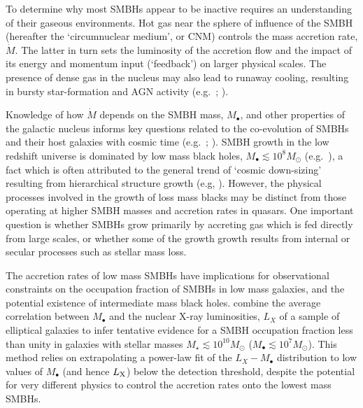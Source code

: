\documentclass[usenatbib,fleqn]{mn2e}
\newcommand{\Mbh}[1][]{M_{\bullet#1}}
\begin{document}
To determine why most SMBHs appear to be inactive requires an understanding of their gaseous environments.  Hot gas near the sphere of influence of the SMBH (hereafter the `circumnuclear medium', or CNM) controls the mass accretion rate, $\dot{M}$.  The latter in turn sets the luminosity of the accretion flow and the impact of its energy and momentum input (`feedback') on larger physical scales.  The presence of dense gas in the nucleus may also lead to runaway cooling, resulting in bursty star-formation and AGN activity (e.g.~\citealt{Ciotti&Ostriker07}; \citealt{Ciotti+10}).

Knowledge of how $\dot{M}$ depends on the SMBH mass, $\Mbh$, and other properties of the
galactic nucleus informs key questions related to the co-evolution of SMBHs and their host galaxies with cosmic time (e.g.~\citealt{Kormendy&Ho13}; \citealt{Heckman&Best14}).  SMBH growth in the low redshift universe is dominated by low mass black holes, $M_{\bullet} \lesssim 10^{8}M_{\odot}$ (e.g.~\citealt{Heckman+04}), a fact which is often attributed to the general trend of `cosmic down-sizing' resulting from hierarchical structure growth (e.g, \citealt{Gallo+08}).  However, the physical processes involved in the growth of loss mass blacks may be distinct from those operating at higher SMBH masses and accretion rates in quasars.  One important question is whether SMBHs grow primarily by accreting gas which is fed directly from large scales, or whether some of the growth growth results from internal or secular processes such as stellar mass loss.

The accretion rates of low mass SMBHs have implications for observational constraints on the occupation fraction of SMBHs in low mass galaxies, and the potential existence of intermediate mass black holes.  \citet{Miller+15} combine the average correlation between $\Mbh$ and the nuclear X-ray luminosities, $L_{X}$ of a sample of elliptical galaxies to infer tentative evidence for a SMBH occupation fraction less than unity in galaxies with stellar masses $M_{\star} \lesssim 10^{10}M_{\odot}$ ($M_{\bullet} \lesssim 10^{7}M_{\odot}$).  This method relies on extrapolating a power-law fit of the $L_X-\Mbh$ distribution to low values of $\Mbh$ (and hence $L_{\rm X}$) below the detection threshold, despite the potential for very different physics to control the accretion rates onto the lowest mass SMBHs.

\end{document}
